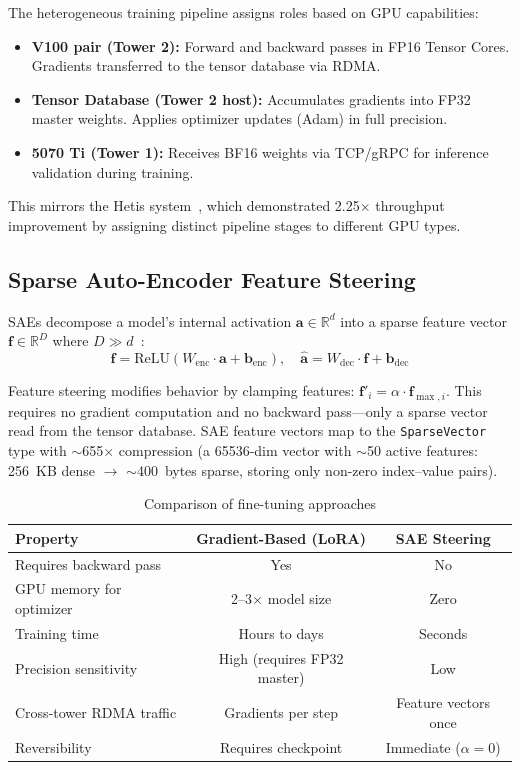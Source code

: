 \documentclass[11pt,letterpaper]{article}
\theoremstyle{definition}
\begin{document}
The heterogeneous training pipeline assigns roles based on GPU capabilities:
\begin{itemize}
    \item \textbf{V100 pair (Tower 2):} Forward and backward passes in FP16 Tensor Cores. Gradients transferred to the tensor database via RDMA.
    \item \textbf{Tensor Database (Tower 2 host):} Accumulates gradients into FP32 master weights. Applies optimizer updates (Adam) in full precision.
    \item \textbf{5070 Ti (Tower 1):} Receives BF16 weights via TCP/gRPC for inference validation during training.
\end{itemize}

This mirrors the Hetis system~\cite{hetis2024}, which demonstrated 2.25$\times$ throughput improvement by assigning distinct pipeline stages to different GPU types.

\subsection{Sparse Auto-Encoder Feature Steering}

SAEs decompose a model's internal activation $\mathbf{a} \in \mathbb{R}^d$ into a sparse feature vector $\mathbf{f} \in \mathbb{R}^D$ where $D \gg d$~\cite{cunningham2023sae, templeton2024scaling}:
\begin{equation}
    \mathbf{f} = \text{ReLU}(W_{\text{enc}} \cdot \mathbf{a} + \mathbf{b}_{\text{enc}}), \quad
    \hat{\mathbf{a}} = W_{\text{dec}} \cdot \mathbf{f} + \mathbf{b}_{\text{dec}}
\end{equation}

Feature steering modifies behavior by clamping features: $\mathbf{f}'_i = \alpha \cdot \mathbf{f}_{\max,i}$. This requires no gradient computation and no backward pass---only a sparse vector read from the tensor database. SAE feature vectors map to the \texttt{SparseVector} type with $\sim$655$\times$ compression (a 65536-dim vector with $\sim$50 active features: 256~KB dense $\to$ $\sim$400~bytes sparse, storing only non-zero index--value pairs).

\begin{table}[htbp]
\centering
\caption{Comparison of fine-tuning approaches}
\label{tab:finetuning-comparison}
\begin{tabular}{@{}lcc@{}}
\toprule
\textbf{Property} & \textbf{Gradient-Based (LoRA)} & \textbf{SAE Steering} \\
\midrule
Requires backward pass & Yes & No \\
GPU memory for optimizer & 2--3$\times$ model size & Zero \\
Training time & Hours to days & Seconds \\
Precision sensitivity & High (requires FP32 master) & Low \\
Cross-tower RDMA traffic & Gradients per step & Feature vectors once \\
Reversibility & Requires checkpoint & Immediate ($\alpha = 0$) \\
\bottomrule
\end{tabular}
\end{table}
\end{document}

